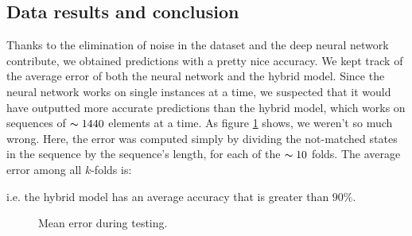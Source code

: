 \documentclass[10pt,a4paper]{article}
\begin{document}
\subsection{Data results and conclusion}
	Thanks to the elimination of noise in the dataset and the deep neural network contribute, we obtained predictions with a pretty nice accuracy. We kept track of the average error of  both the neural network and the hybrid model. Since the neural network works on single instances at a time, we suspected that it would have outputted more accurate predictions than the hybrid model, which works on sequences of $\thicksim 1440$ elements at a time. As figure \ref{figure:err_graph} shows, we weren't so much wrong. Here, the error was computed simply by dividing the not-matched states in the sequence by the sequence's length, for each of the $\thicksim 10$ folds. The average error among all $k$-folds is:\\
	\begin{center}
	\end{center}
i.e. the hybrid model has an average accuracy that is greater than $90\%.$
	\begin{figure}
		\centering
		\caption{Mean error during testing.}
		\label{figure:err_graph}
	\end{figure}
	
\end{document}
